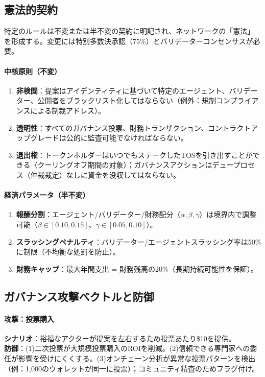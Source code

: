\documentclass[11pt]{article}
\begin{document}
\subsection{憲法的契約}

特定のルールは不変または半不変の契約に明記され、ネットワークの「憲法」を形成する。変更には特別多数決承認（75\%）とバリデーターコンセンサスが必要。

\paragraph{中核原則（不変）}
\begin{enumerate}[noitemsep]
  \item \textbf{非検閲}：提案はアイデンティティに基づいて特定のエージェント、バリデーター、公開者をブラックリスト化してはならない（例外：規制コンプライアンスによる制裁アドレス）。
  \item \textbf{透明性}：すべてのガバナンス投票、財務トランザクション、コントラクトアップグレードは公的に監査可能でなければならない。
  \item \textbf{退出権}：トークンホルダーはいつでもステークしたTOSを引き出すことができる（クーリングオフ期間の対象）；ガバナンスアクションはデュープロセス（仲裁裁定）なしに資金を没収してはならない。
\end{enumerate}

\paragraph{経済パラメータ（半不変）}
\begin{enumerate}[noitemsep]
  \item \textbf{報酬分割}：エージェント/バリデーター/財務配分（$\alpha, \beta, \gamma$）は境界内で調整可能（$\beta \in [0.10, 0.15]$、$\gamma \in [0.05, 0.10]$）。
  \item \textbf{スラッシングペナルティ}：バリデーター/エージェントスラッシング率は50\%に制限（不均衡な処罰を防止）。
  \item \textbf{財務キャップ}：最大年間支出 = 財務残高の20\%（長期持続可能性を保証）。
\end{enumerate}

\subsection{ガバナンス攻撃ベクトルと防御}

\paragraph{攻撃：投票購入}
\textbf{シナリオ}：裕福なアクターが提案を左右するため投票あたり\$10を提供。\\
\textbf{防御}：(1)二次投票が大規模投票購入のROIを削減。(2)信頼できる専門家への委任が影響を受けにくくする。(3)オンチェーン分析が異常な投票パターンを検出（例：1,000のウォレットが同一に投票）；コミュニティ精査のためフラグ付け。
\end{document}
